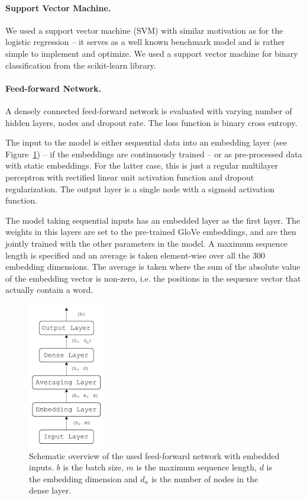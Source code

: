 \paragraph{Support Vector Machine.}
We used a support vector machine (SVM) with similar motivation as for the logistic regression -- it serves as a well known benchmark model and is rather simple to implement and optimize.  We used a support vector machine for binary classification from the scikit-learn library. 

\paragraph{Feed-forward Network.}
A densely connected feed-forward network is evaluated with varying number of hidden layers, nodes and dropout rate. The loss function is binary cross entropy. 

The input to the model is either sequential data into an embedding layer (see Figure~\ref{fig:emb_ff}) -- if the embeddings are continuously trained -- or as pre-processed data with static embeddings. For the latter case, this is just a regular multilayer perceptron with rectified linear unit activation function and dropout regularization. The output layer is a single node with a sigmoid activation function.

The model taking sequential inputs has an embedded layer as the first layer. The weights in this layers are set to the pre-trained GloVe embeddings, and are then jointly trained with the other parameters in the model. A maximum sequence length is specified and an average is taken element-wise over all the 300 embedding dimensions. The average is taken where the sum of the absolute value of the embedding vector is non-zero, i.e. the positions in the sequence vector that actually contain a word.

\begin{figure}[t]
    \centering
    \includegraphics[width=0.3\textwidth]{Figures/figs-ff_emb.pdf}
    \caption{Schematic overview of the used feed-forward network with embedded inputs. $b$ is the batch size, $m$ is the maximum sequence length, $d$ is the embedding dimension and $d_n$ is the number of nodes in the dense layer.}
\label{fig:emb_ff}
\end{figure}


